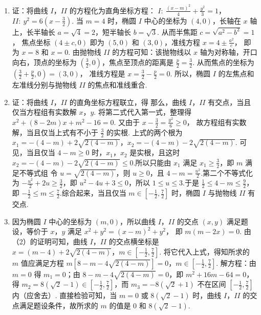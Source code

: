 \begin{solution}
\begin{enumerate}
\item 证：将曲线 \(I\)，\(II\) 的方程化为直角坐标方程：
\(I:\ \frac{(x-m)^{2}}{4}+\frac{y^{2}}{3}=1\)，\(II:\ y^{2}=6\left(x-\frac{3}{2}\right)\).
当 \(m = 4\) 时，椭圆 \(I\) 中心的坐标为 \((4,0)\)，长轴在 \(x\) 轴上，长半轴长 \(a = \sqrt{4} = 2\)，短半轴长 \(b = \sqrt{3}\). 从而半焦距
\(c = \sqrt{a^2 - b^2} = 1\)，
焦点坐标 \((4 \pm c,0)\) 即为 \((5,0)\) 和 \((3,0)\)，准线方程
\(x = 4 \pm \frac{a^2}{c}\)，
即为 \(x = 8\) 和 \(x = 0\).
由抛物线 \(II\) 的方程可知：该抛物线以 \(x\) 轴为对称轴，开口向右，顶点的坐标为 \(\left(\frac{3}{2},0\right)\)，焦点至顶点的距离是 \(\frac{p}{2}=\frac{3}{2}\). 从而焦点的坐标为
\(\left(\frac{3}{2}+\frac{p}{2},0\right)=(3,0)\)，
准线方程是
\(x=\frac{3}{2}-\frac{p}{2}=0\).
所以，椭圆 \(I\) 的左焦点和左准线分别与抛物线 \(II\) 的焦点和准线重合.

\item 证：将曲线 \(I\)，\(II\) 的直角坐标方程联立，得
那么，曲线 \(I\)，\(II\) 有交点，当且仅当方程组有实数解 \(x\)，\(y\). 将第二式代入第一式，整理得
\(x^{2}+(8-2m)x+m^{2}-16=0\).
又由于
\(x - \frac{3}{2} = \frac{y^2}{6} \geq 0\)，
故方程组有实数解，当且仅当上式有不小于 \(\frac{3}{2}\) 的实根.
上式的两个根为
\(x_{1}=-(4-m)+2\sqrt{2(4-m)}\)，\(x_{2}=-(4-m)-2\sqrt{2(4-m)}\).
可见，当且仅当 \(4-m\geqslant0\) 时，\(x_1\)，\(x_2\) 是实根，且这时 \(x_2=-(4-m)-2\sqrt{2(4-m)}\leqslant0\).所以只能由 \(x_1\) 满足 \(x_1\geqslant\frac32\)，即 \(m\) 满足不等式组
令 \(u=\sqrt{2(4-m)}\)，则 \(u\geqslant0\)，且 \(4-m=\frac{u^{2}}2\).第二个不等式化为 \(-\frac{u^{2}}2+2u\geqslant\frac32\)，即 \(u^{2}-4u+3\leqslant0\)，所以 \(1\leqslant u\leqslant3\).于是 \(\frac12\leqslant4-m\leqslant\frac92\)，即 \(-\frac12\leqslant m\leqslant\frac72\).综合起来，当且仅当 \(m\in\left[-\frac12,\frac72\right]\) 时，椭圆 \(I\) 与抛物线 \(II\) 有交点.

\item 因为椭圆 \(I\) 中心的坐标为 \((m,0)\)，所以曲线 \(I\)，\(II\) 的交点 \((x, y)\) 满足题设，等价于 \(x\)，\(y\) 满足
\(x^{2} + y^{2} = (x - m)^{2} + y^{2}\)，
即
\(m(m-2x)=0\).
由（2）的证明可知，曲线 \(I\)，\(II\) 的交点横坐标是
\(x = (m - 4) + 2 \sqrt{2(4 - m)}\)，\(m \in \left[-\frac{1}{2}, \frac{7}{2}\right]\).
将它代入上式，得知所求的 \(m\) 值应满足方程
\(m \left[ 8 - m - 4 \sqrt{2 (4 - m)} \right] = 0\)，\(m \in \left[-\frac{1}{2}, \frac{7}{2}\right]\).
解方程：由 \(m = 0\) 得 \(m_{1} = 0\)；由 \(8 - m - 4\sqrt{2(4 - m)} = 0\)，即
\(m^{2} + 16m - 64 = 0\)，
得 \(m_{2} = 8(\sqrt{2} -1)\in \left[-\frac{1}{2},\frac{7}{2}\right]\)，而 \(m_{3} = -8(\sqrt{2} +1)\) 不在区间 \(\left[-\frac{1}{2},\frac{7}{2}\right]\) 内（应舍去）. 直接检验可知，当 \(m = 0\) 或 \(8(\sqrt{2} - 1)\) 时，曲线 \(I\)，\(II\) 的交点满足题设条件，故所求的 \(m\) 的值是 \(0\) 和 \(8(\sqrt{2} - 1)\).
\end{enumerate}
\end{solution}


